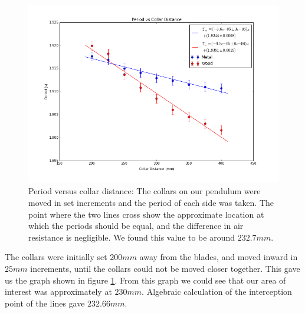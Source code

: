 \begin{figure}
\includegraphics[width=\linewidth]{periodVsCollar.png}
\caption{Period versus collar distance: The collars on our pendulum were moved in set increments and the period of each side was taken. The point where the two lines cross show the approximate location at which the periods should be equal, and the difference in air resistance is negligible. We found this value to be around $232.7mm$.}
\label{fig:PvC}
\end{figure}

The collars were initially set $200mm$ away from the blades, and moved inward in $25mm$ increments, until the collars could not be moved closer together. This gave us the graph shown in figure \ref{fig:PvC}. From this graph we could see that our area of interest was approximately at $230mm$. Algebraic calculation of the interception point of the lines gave $232.66mm$.

